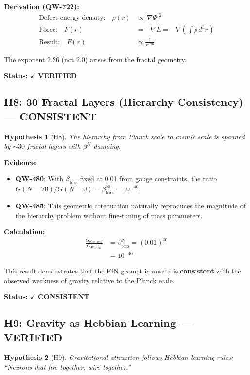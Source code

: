 \documentclass[11pt,a4paper]{book}
\newtheorem{hypothesis}{Hypothesis}[section]
\theoremstyle{remark}
\newcommand{\betators}{\beta_{\text{tors}}}
\newcommand{\QW}[1]{\textbf{QW-#1}}
\begin{document}
\textbf{Derivation (\QW{722}):}
\begin{align}
\text{Defect energy density:} \quad \rho(r) &\propto |\nabla\Psi|^2 \\
\text{Force:} \quad F(r) &= -\nabla E = -\nabla\left(\int \rho \, d^3r\right) \\
\text{Result:} \quad F(r) &\propto \frac{1}{r^{2.26}}
\end{align}

The exponent 2.26 (not 2.0) arises from the fractal geometry.

\textbf{Status:} $\checkmark$ \textbf{VERIFIED}

\subsection{H8: 30 Fractal Layers (Hierarchy Consistency) --- CONSISTENT}

\begin{hypothesis}[H8]
The hierarchy from Planck scale to cosmic scale is spanned by $\sim 30$ fractal layers with $\beta^N$ damping.
\end{hypothesis}

\textbf{Evidence:}
\begin{itemize}
    \item \QW{480}: With $\betators$ fixed at 0.01 from gauge constraints, the ratio $G(N=20)/G(N=0) = \betators^{20} = 10^{-40}$.
    \item \QW{485}: This geometric attenuation naturally reproduces the magnitude of the hierarchy problem without fine-tuning of mass parameters.
\end{itemize}

\textbf{Calculation:}
\begin{align}
\frac{G_{observed}}{G_{Planck}} &= \betators^{N} = (0.01)^{20} \\
&= 10^{-40}
\end{align}

This result demonstrates that the FIN geometric ansatz is \textbf{consistent} with the observed weakness of gravity relative to the Planck scale.

\textbf{Status:} $\checkmark$ \textbf{CONSISTENT}

\subsection{H9: Gravity as Hebbian Learning --- VERIFIED}

\begin{hypothesis}[H9]
Gravitational attraction follows Hebbian learning rules: ``Neurons that fire together, wire together.''
\end{hypothesis}
\end{document}

